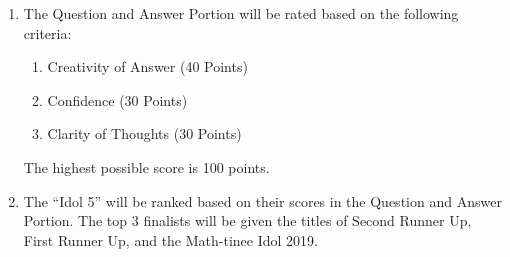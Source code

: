\documentclass[11pt]{article}
\begin{document}
\begin{enumerate}[label = \arabic*. ]
\item The Question and Answer Portion will be rated based on the following criteria: 
\begin{enumerate}[label = \alph*. ]
\item Creativity of Answer (40 Points)
\item Confidence (30 Points)
\item Clarity of Thoughts (30 Points)

\end{enumerate}  
The highest possible score is 100 points. 
\item The ``Idol 5'' will be ranked based on their scores in the Question and Answer Portion. The top 3 finalists will be given the titles of Second Runner Up, First Runner Up, and the Math-tinee Idol 2019.
\end{enumerate}  
\end{document}
